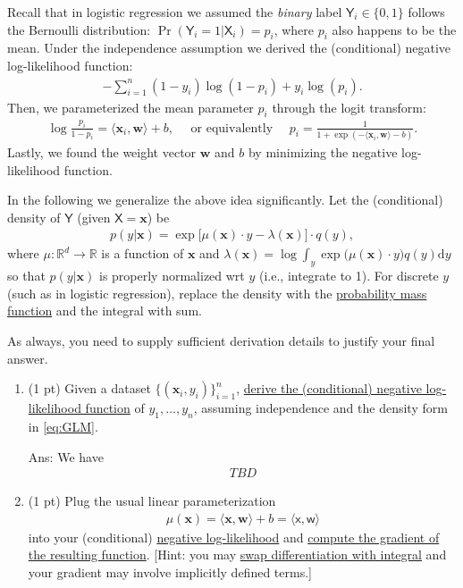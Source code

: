 \documentclass[10pt]{article}
\newcommand{\RR}{\mathds{R}}
\newcommand{\wv}{\mathbf{w}}
\newcommand{\xv}{\mathbf{x}}
\newcommand{\inner}[2]{\langle #1, #2 \rangle}
\newcommand{\red}[1]{{\color{red}#1}}
\newcommand{\xbs}{\bm{\mathsf{x}}}
\newcommand{\wbs}{\bm{\mathsf{w}}}
\newcommand{\Ysf}{\mathsf{Y}}
\newcommand{\Xsf}{\mathsf{X}}
\newcommand{\ans}[1]{{\color{orange}\textsf{Ans}: #1}}
\begin{document}
\begin{exercise}
Recall that in logistic regression we assumed the \emph{binary} label $\Ysf_i \in \{0,1\}$ follows the Bernoulli distribution: $\Pr(\Ysf_i = 1 | \Xsf_i) = p_i$, where $p_i$ also happens to be the mean. Under the independence assumption we derived the (conditional) negative log-likelihood function:
\begin{align}
-\sum_{i=1}^n (1-y_i) \log(1-p_i) + y_i \log(p_i).
\end{align}
Then, we parameterized the mean parameter $p_i$ through the logit transform:
\begin{align}
\log\frac{p_i}{1-p_i} = \inner{\xv_i}{\wv} + b, \quad \mbox{ or equivalently } \quad p_i = \frac{1}{1+\exp(-\inner{\xv_i}{\wv} - b)}.
\end{align}
Lastly, we found the weight vector $\wv$ and $b$ by minimizing the negative log-likelihood function.

In the following we generalize the above idea significantly. Let the (conditional) density of $\Ysf$ (given $\Xsf= \xv$) be
\begin{align}
\label{eq:GLM}
p(y| \xv) = \exp\Big[ \mu(\xv)\cdot y - \lambda(\xv) \Big] \cdot q(y),
\end{align}
where $\mu:\RR^d \to \RR$ is a function of $\xv$ and $\lambda(\xv) = \log \int_y \exp\big( \mu(\xv) \cdot y \big)  q(y) \mathrm{d} y$ so that $p(y|\xv)$ is properly normalized wrt $y$ (i.e., integrate to 1). For discrete $y$ (such as in logistic regression), replace the density with the \href{https://en.wikipedia.org/wiki/Probability_mass_function}{probability mass function} and the integral with sum.

\red{As always, you need to supply sufficient derivation details to justify your final answer.}

\begin{enumerate}
\item (1 pt) Given a dataset $\{(\xv_i, y_i)\}_{i=1}^n$, \uline{derive the (conditional) negative log-likelihood function} of $y_1, \ldots, y_n$, assuming independence and the density form in \eqref{eq:GLM}. 

\ans{We have 
\begin{align}
TBD 
\end{align}
}

\item (1 pt) Plug the usual linear parameterization 
\begin{align}
\mu(\xv) = \inner{\xv}{\wv} + b = \inner{\xbs}{\wbs}
\end{align}
into your (conditional) \uline{negative log-likelihood} and \uline{compute the gradient of the resulting function}. [Hint: you may \href{https://en.wikipedia.org/wiki/Leibniz_integral_rule}{swap differentiation with integral} and your gradient may involve implicitly defined terms.]


\end{enumerate}
\end{exercise}
\end{document}
